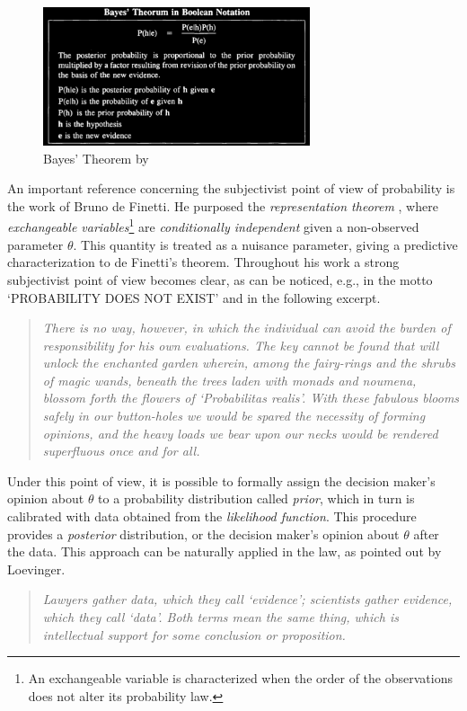 \documentclass[a4paper]{exam}
\theoremstyle{plain}
\begin{document}
\begin{figure}[!h]
  \begin{center}
    \includegraphics[width=0.7\textwidth]{bayes_loevinger.png}
  \caption{Bayes' Theorem by \cite[p. 327]{loevinger1992standards}}
  \label{fig:bayes}
  \end{center}
\end{figure}

An important reference concerning the subjectivist point of view of probability is the work of Bruno de Finetti. He purposed the \textit{representation theorem} \cite{definetti1937prevision}, where \textit{exchangeable variables}\footnote{An exchangeable variable is characterized when the order of the observations does not alter its probability law.} are \textit{conditionally independent} given a non-observed parameter $\theta$. This quantity is treated as a nuisance parameter, giving a predictive characterization to de Finetti's theorem. Throughout his work a strong subjectivist point of view becomes clear, as can be noticed, e.g., in the motto `PROBABILITY DOES NOT EXIST' \cite[p. x]{finetti1974theory} and in the following excerpt.
\begin{quote}
\textit{There is no way, however, in which the individual can avoid the burden of responsibility for his own evaluations. The key cannot be found that will unlock the enchanted garden wherein, among the fairy-rings and the shrubs of magic wands, beneath the trees laden with monads and noumena, blossom forth the flowers of `Probabilitas realis'. With these fabulous blooms safely in our button-holes we would be spared the necessity of forming opinions, and the heavy loads we bear upon our necks would be rendered superfluous once and for all.} \cite[p. 42]{finetti1975theory}
\end{quote}

Under this point of view, it is possible to formally assign the decision maker's opinion about $\theta$ to a probability distribution called \textit{prior}, which in turn is calibrated with data obtained from the \textit{likelihood function}. This procedure provides a \textit{posterior} distribution, or the decision maker's opinion about $\theta$ after the data. This approach can be naturally applied in the law, as pointed out by Loevinger.
\begin{quote}
\textit{Lawyers gather data, which they call `evidence'; scientists gather evidence, which they call `data'. Both terms mean the same thing, which is intellectual support for some conclusion or proposition.} \cite[p. 323]{loevinger1992standards}
\end{quote}
\end{document}
